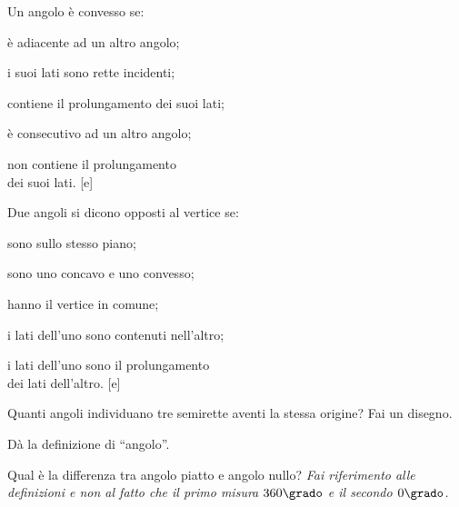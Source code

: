 \begin{esercizio}
\label{ese:1.51}
Un angolo è convesso se:
\begin{multicols}{2}
\begin{enumeratea}
\item è adiacente ad un altro angolo;
\item i suoi lati sono rette incidenti;
\item contiene il prolungamento dei suoi lati;
\item è consecutivo ad un altro angolo;
\item non contiene il prolungamento \\ 
      dei suoi lati.
\hfill[e]
\end{enumeratea}
\end{multicols}
\end{esercizio}


\begin{esercizio}
\label{ese:1.52}
Due angoli si dicono opposti al vertice se:
\begin{multicols}{2}
\begin{enumeratea}
\item sono sullo stesso piano;
\item sono uno concavo e uno convesso;
\item hanno il vertice in comune;
\item i lati dell'uno sono contenuti nell'altro;
\item i lati dell'uno sono il prolungamento \\ 
      dei lati dell'altro.
\hfill[e]
\end{enumeratea}
\end{multicols}
\end{esercizio}

\begin{esercizio}
\label{ese:1.53}
Quanti angoli individuano tre semirette aventi la stessa origine? Fai 
un disegno.
\end{esercizio}

\begin{esercizio}
\label{ese:1.54}
Dà la definizione di ``angolo''.
\end{esercizio}

\begin{esercizio}
\label{ese:1.55}
Qual è la differenza tra angolo piatto e angolo nullo? \emph{Fai 
riferimento alle definizioni e non al fatto che il primo misura 
\(360\grado\) e il secondo \(0\grado\).}
\end{esercizio}

